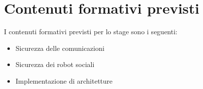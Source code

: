 \section*{Contenuti formativi previsti}
I contenuti formativi previsti per lo stage sono i seguenti:
\begin{itemize}
    \item Sicurezza delle comunicazioni
    \item Sicurezza dei robot sociali
    \item Implementazione di architetture
\end{itemize}
\newpage